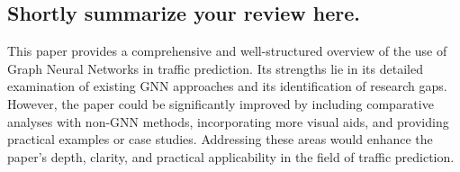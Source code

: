 \documentclass[12pt]{article}
\begin{document}
\subsection*{Shortly summarize your review here.}
This paper provides a comprehensive and well-structured overview of the use of Graph Neural Networks in traffic prediction. 
Its strengths lie in its detailed examination of existing GNN approaches and its identification of research gaps. However, the paper could be significantly improved by including comparative analyses with non-GNN methods, incorporating more visual aids, and providing practical examples or case studies. Addressing these areas would enhance the paper's depth, clarity, and practical applicability in the field of traffic prediction.
\end{document}
